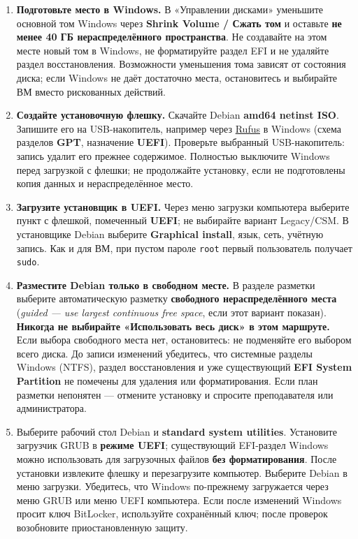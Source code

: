 \begin{enumerate}
\def\labelenumi{\arabic{enumi}.}
\tightlist
\item
  \textbf{Подготовьте место в Windows.} В «Управлении дисками» уменьшите
  основной том Windows через \textbf{Shrink Volume / Сжать том} и
  оставьте \textbf{не менее 40 ГБ нераспределённого пространства}. Не
  создавайте на этом месте новый том в Windows, не форматируйте раздел
  EFI и не удаляйте раздел восстановления. Возможности уменьшения тома
  зависят от состояния диска; если Windows не даёт достаточно места,
  остановитесь и выбирайте ВМ вместо рискованных действий.
\item
  \textbf{Создайте установочную флешку.} Скачайте Debian \textbf{amd64
  netinst ISO}. Запишите его на USB-накопитель, например через
  \href{https://rufus.ie/}{Rufus} в Windows (схема разделов
  \textbf{GPT}, назначение \textbf{UEFI}). Проверьте выбранный
  USB-накопитель: запись удалит его прежнее содержимое. Полностью
  выключите Windows перед загрузкой с флешки; не продолжайте установку,
  если не подготовлены копия данных и нераспределённое место.
\item
  \textbf{Загрузите установщик в UEFI.} Через меню загрузки компьютера
  выберите пункт с флешкой, помеченный \textbf{UEFI}; не выбирайте
  вариант Legacy/CSM. В установщике Debian выберите \textbf{Graphical
  install}, язык, сеть, учётную запись. Как и для ВМ, при пустом пароле
  \texttt{root} первый пользователь получает \texttt{sudo}.
\item
  \textbf{Разместите Debian только в свободном месте.} В разделе
  разметки выберите автоматическую разметку \textbf{свободного
  нераспределённого места} (\emph{guided --- use largest continuous free
  space}, если этот вариант показан). \textbf{Никогда не выбирайте
  «Использовать весь диск» в этом маршруте.} Если выбора свободного
  места нет, остановитесь: не подменяйте его выбором всего диска. До
  записи изменений убедитесь, что системные разделы Windows (NTFS),
  раздел восстановления и уже существующий \textbf{EFI System Partition}
  не помечены для удаления или форматирования. Если план разметки
  непонятен --- отмените установку и спросите преподавателя или
  администратора.
\item
  Выберите рабочий стол Debian и \textbf{standard system utilities}.
  Установите загрузчик GRUB в \textbf{режиме UEFI}; существующий
  EFI-раздел Windows можно использовать для загрузочных файлов
  \textbf{без форматирования}. После установки извлеките флешку и
  перезагрузите компьютер. Выберите Debian в меню загрузки. Убедитесь,
  что Windows по-прежнему загружается через меню GRUB или меню UEFI
  компьютера. Если после изменений Windows просит ключ BitLocker,
  используйте сохранённый ключ; после проверок возобновите
  приостановленную защиту.
\end{enumerate}

